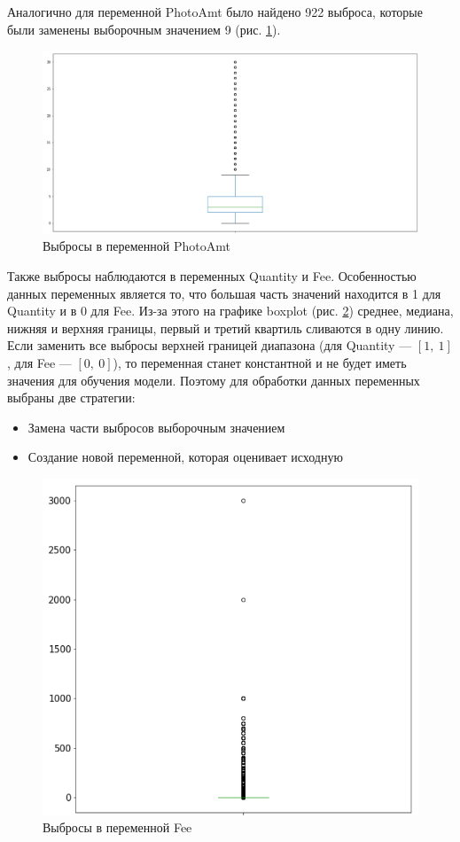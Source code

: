 \documentclass[14pt]{mmcs_article}
\begin{document}
Аналогично для переменной PhotoAmt было найдено 922 выброса, которые были заменены выборочным значением 9 (рис. \ref{analyse:photooutlier}).

\begin{figure}[H]
	\centering
	\includegraphics[scale=0.7]{photooutlier.png}
	\caption{Выбросы в переменной PhotoAmt}\label{analyse:photooutlier}
\end{figure}

Также выбросы наблюдаются в переменных Quantity и Fee. Особенностью данных переменных является то, что большая часть значений находится в 1 для Quantity и в 0 для Fee. Из-за этого на графике boxplot (рис. \ref{analyse:feeoutlier}) среднее, медиана, нижняя и верхняя границы, первый и третий квартиль сливаются в одну линию. Если заменить все выбросы верхней границей диапазона (для Quantity --- $[1,\ 1]$, для Fee --- $[0,\ 0]$), то переменная станет константной и не будет иметь значения для обучения модели. Поэтому для обработки данных переменных выбраны две стратегии:
\begin{itemize}
	\item Замена части выбросов выборочным значением
	\item Создание новой переменной, которая оценивает исходную
\end{itemize}

\begin{figure}[H]
	\centering
	\includegraphics[scale=0.7]{feeoutlier.png}
	\caption{Выбросы в переменной Fee}\label{analyse:feeoutlier}
\end{figure}
\end{document}
